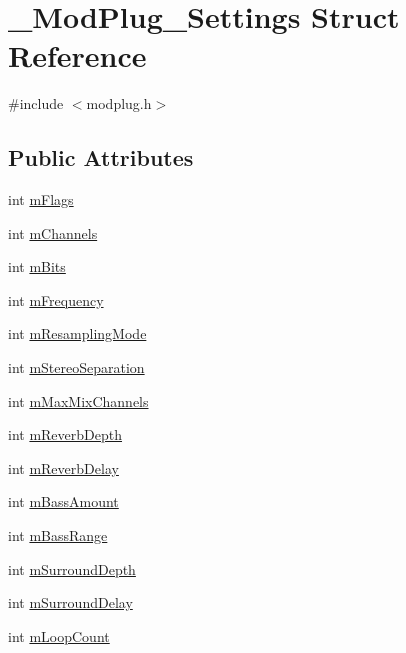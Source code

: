 \hypertarget{struct___mod_plug___settings}{}\section{\+\_\+\+Mod\+Plug\+\_\+\+Settings Struct Reference}
\label{struct___mod_plug___settings}


{\ttfamily \#include $<$modplug.\+h$>$}

\subsection*{Public Attributes}
\begin{DoxyCompactItemize}
\item 
int \mbox{\hyperlink{struct___mod_plug___settings_a6d6696417c4caff3f09d36baf92006b7}{m\+Flags}}
\item 
int \mbox{\hyperlink{struct___mod_plug___settings_a2280186258a8cef1567f93bb4da95c04}{m\+Channels}}
\item 
int \mbox{\hyperlink{struct___mod_plug___settings_ab49a2d1c5ab8afec56dafe1467529e92}{m\+Bits}}
\item 
int \mbox{\hyperlink{struct___mod_plug___settings_aaec207c7aa654b3de485ed02341da356}{m\+Frequency}}
\item 
int \mbox{\hyperlink{struct___mod_plug___settings_a00d3645339ec6ccdd8b154b86d392942}{m\+Resampling\+Mode}}
\item 
int \mbox{\hyperlink{struct___mod_plug___settings_a2906101705684b05d16f1212365d291c}{m\+Stereo\+Separation}}
\item 
int \mbox{\hyperlink{struct___mod_plug___settings_ab81e368c3b7fe205089dc4afae94e626}{m\+Max\+Mix\+Channels}}
\item 
int \mbox{\hyperlink{struct___mod_plug___settings_a3088c928cd67803cbe95e69adbcd0f9b}{m\+Reverb\+Depth}}
\item 
int \mbox{\hyperlink{struct___mod_plug___settings_ac29c29f77e76f3009271379c8a2b7f85}{m\+Reverb\+Delay}}
\item 
int \mbox{\hyperlink{struct___mod_plug___settings_a7b55a6dcc1648d72b417412fb296b425}{m\+Bass\+Amount}}
\item 
int \mbox{\hyperlink{struct___mod_plug___settings_a5e457489a8f30b260d8f54deedcfa9c3}{m\+Bass\+Range}}
\item 
int \mbox{\hyperlink{struct___mod_plug___settings_ab7b85a1f1b55f106534a0617696ee5ff}{m\+Surround\+Depth}}
\item 
int \mbox{\hyperlink{struct___mod_plug___settings_add6f7a33c37bc48fc64410f0677c38d3}{m\+Surround\+Delay}}
\item 
int \mbox{\hyperlink{struct___mod_plug___settings_a3b254e6c9ea5242943adf5bf1362a5fd}{m\+Loop\+Count}}
\end{DoxyCompactItemize}


